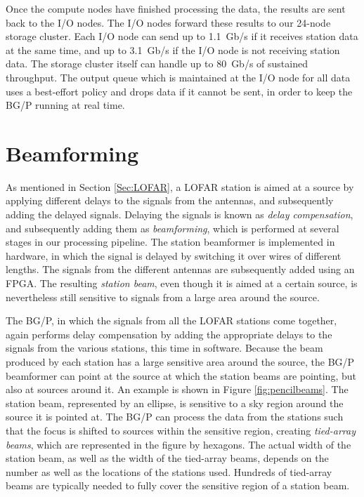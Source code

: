 \documentclass{llncs}
\begin{document}
Once the compute nodes have finished processing the data, the results are sent back to the I/O nodes. The I/O nodes forward these results to our 24-node storage cluster. Each I/O node can send up to 1.1~Gb/s if it receives station data at the same time, and up to 3.1~Gb/s if the I/O node is not receiving station data. The storage cluster itself can handle up to 80~Gb/s of sustained throughput. The output queue which is maintained at the I/O node for all data uses a best-effort policy and drops data if it cannot be sent, in order to keep the BG/P running at real time.


\section{Beamforming}
\label{Sec:Beamforming}

As mentioned in Section \ref{Sec:LOFAR}, a LOFAR station is aimed at a source by applying different delays to the signals from the antennas, and subsequently adding the delayed signals. Delaying the signals is known as \emph{delay compensation}, and subsequently adding them as \emph{beamforming}, which is performed at several stages in our processing pipeline. The station beamformer is implemented in hardware, in which the signal is delayed by switching it over wires of different lengths. The signals from the different antennas are subsequently added using an FPGA. The resulting \emph{station beam}, even though it is aimed at a certain source, is nevertheless still sensitive to signals from a large area around the source. 

The BG/P, in which the signals from all the LOFAR stations come together, again performs delay compensation by adding the appropriate delays to the signals from the various stations, this time in software. Because the beam produced by each station has a large sensitive area around the source, the BG/P beamformer can point at the source at which the station beams are pointing, but also at sources around it. An example is shown in Figure \ref{fig:pencilbeams}. The station beam, represented by an ellipse, is sensitive to a sky region around the source it is pointed at. The BG/P can process the data from the stations such that the focus is shifted to sources within the sensitive region, creating \emph{tied-array beams}, which are represented in the figure by hexagons. The actual width of the station beam, as well as the width of the tied-array beams, depends on the number as well as the locations of the stations used. Hundreds of tied-array beams are typically needed to fully cover the sensitive region of a station beam.
\end{document}
